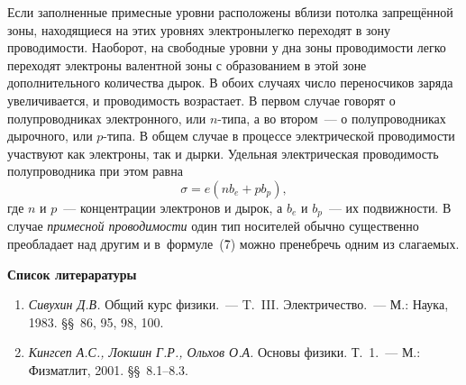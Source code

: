 Если заполненные примесные уровни расположены вблизи потолка запрещённой зоны, находящиеся на этих уровнях электронылегко переходят в зону проводимости. Наоборот, на свободные уровни у дна зоны проводимости легко переходят электроны валентной зоны с образованием в этой зоне дополнительного количества дырок. В обоих случаях число переносчиков заряда увеличивается, и проводимость возрастает. В первом случае говорят о полупроводниках {электронного}, или $n$-типа, а во втором~--- о  полупроводниках дырочного, или $p$-типа. В общем случае в процессе электрической проводимости участвуют как электроны, так и дырки. Удельная электрическая проводимость полупроводника при этом равна
\begin{equation}
\sigma=e(nb_e+pb_p),
\end{equation}
где $n$ и $p$~--- концентрации электронов и дырок, а $b_e$ и $b_p$~--- их подвижности. В случае \textit{примесной
проводимости} один тип носителей обычно существенно преобладает над другим и в~формуле~(\r7) можно пренебречь одним из слагаемых.


{\small


{\bf \Large Список литераратуры}

\begin{enumerate}
\item{ \emph{Сивухин Д.В.} Общий курс физики.~--- T.~III. Электричество.~--- М.: Наука, 1983. \S\S~86, 95, 98, 100.}
\item{ \emph{Кингсеп А.С., Локшин Г.Р., Ольхов О.А.} Основы физики. Т.~1.~--- М.: Физматлит, 2001. \S\S~8.1--8.3.}
\end{enumerate}

}

